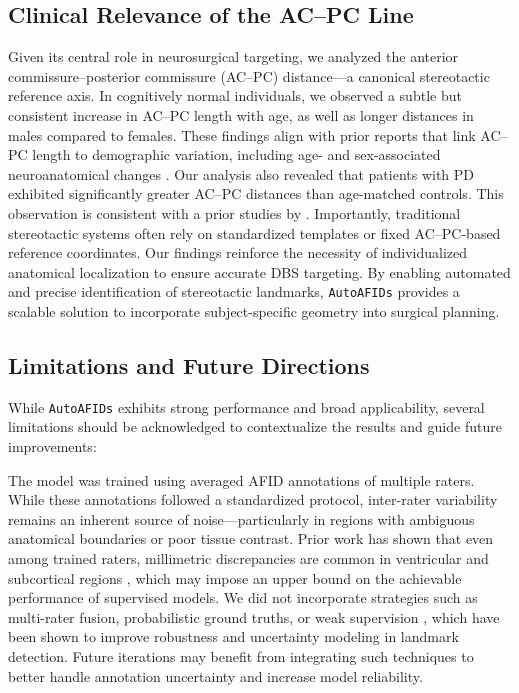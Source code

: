 \subsection{Clinical Relevance of the AC–PC Line}
Given its central role in neurosurgical targeting, we analyzed the anterior commissure–posterior commissure (AC–PC) distance—a canonical stereotactic reference axis. In cognitively normal individuals, we observed a subtle but consistent increase in AC–PC length with age, as well as longer distances in males compared to females. These findings align with prior reports that link AC–PC length to demographic variation, including age- and sex-associated neuroanatomical changes \cite{Lee2008-nd}. Our analysis also revealed that patients with PD exhibited significantly greater AC–PC distances than age-matched controls. This observation is consistent with a prior studies by \cite{Lee2008-nd,Dabadi2020-am}. Importantly, traditional stereotactic systems often rely on standardized templates or fixed AC–PC-based reference coordinates. Our findings reinforce the necessity of individualized anatomical localization to ensure accurate DBS targeting. By enabling automated and precise identification of stereotactic landmarks, \texttt{AutoAFIDs} provides a scalable solution to incorporate subject-specific geometry into surgical planning.

\subsection{Limitations and Future Directions}

While \texttt{AutoAFIDs} exhibits strong performance and broad applicability, several limitations should be acknowledged to contextualize the results and guide future improvements:

The model was trained using averaged AFID annotations of multiple raters. While these annotations followed a standardized protocol, inter-rater variability remains an inherent source of noise—particularly in regions with ambiguous anatomical boundaries or poor tissue contrast. Prior work has shown that even among trained raters, millimetric discrepancies are common in ventricular and subcortical regions \cite{Lau2019-eh,Abbass2022-lf}, which may impose an upper bound on the achievable performance of supervised models. We did not incorporate strategies such as multi-rater fusion, probabilistic ground truths, or weak supervision \cite{Salari2024-rw}, which have been shown to improve robustness and uncertainty modeling in landmark detection. Future iterations may benefit from integrating such techniques to better handle annotation uncertainty and increase model reliability.

